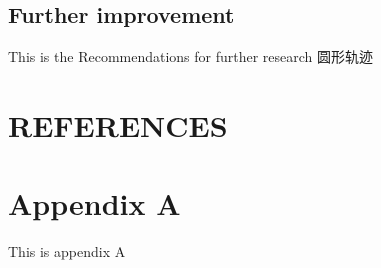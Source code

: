 \documentclass[12pt]{article}
\begin{document}
\begin{flushleft}
\subsection{Further improvement}
This is the Recommendations for further research\cite{lenain2006high}
圆形轨迹



\newpage
\section{REFERENCES}



\newpage
\appendix
\renewcommand{\appendixname}{Appendix~\Alph{section}}

\section{Appendix A}
This is appendix A

\end{flushleft}
\end{document}
